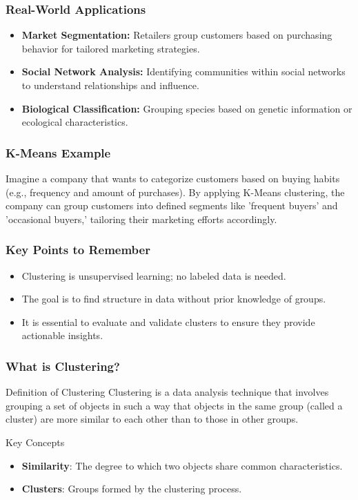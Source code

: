 \documentclass[aspectratio=169]{beamer}
\begin{document}
\begin{frame}[fragile]
    \frametitle{Real-World Applications}
    \begin{itemize}
        \item \textbf{Market Segmentation:} Retailers group customers based on purchasing behavior for tailored marketing strategies.
        \item \textbf{Social Network Analysis:} Identifying communities within social networks to understand relationships and influence.
        \item \textbf{Biological Classification:} Grouping species based on genetic information or ecological characteristics.
    \end{itemize}
\end{frame}

\begin{frame}[fragile]
    \frametitle{K-Means Example}
    Imagine a company that wants to categorize customers based on buying habits (e.g., frequency and amount of purchases). By applying K-Means clustering, the company can group customers into defined segments like 'frequent buyers' and 'occasional buyers,' tailoring their marketing efforts accordingly.
\end{frame}

\begin{frame}[fragile]
    \frametitle{Key Points to Remember}
    \begin{itemize}
        \item Clustering is unsupervised learning; no labeled data is needed.
        \item The goal is to find structure in data without prior knowledge of groups.
        \item It is essential to evaluate and validate clusters to ensure they provide actionable insights.
    \end{itemize}
\end{frame}

\begin{frame}[fragile]
    \frametitle{What is Clustering?}
    \begin{block}{Definition of Clustering}
        Clustering is a data analysis technique that involves grouping a set of objects in such a way that objects in the same group (called a cluster) are more similar to each other than to those in other groups. 
    \end{block}
    \begin{block}{Key Concepts}
        \begin{itemize}
            \item \textbf{Similarity}: The degree to which two objects share common characteristics.
            \item \textbf{Clusters}: Groups formed by the clustering process.
        \end{itemize}
    \end{block}
\end{frame}
\end{document}

